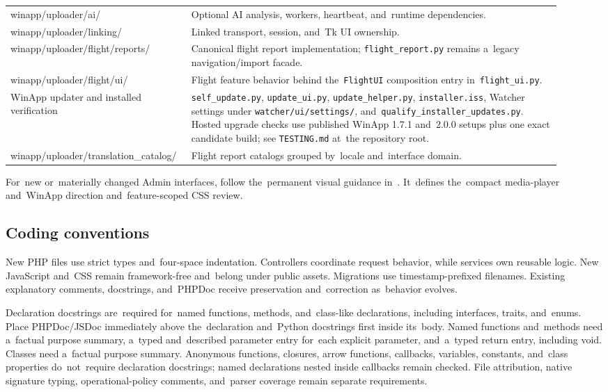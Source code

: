 \documentclass[11pt,a4paper]{article}
\newcommand{\filepath}[1]{\path{#1}}
\begin{document}
\begin{longtable}{>{\ttfamily}p{0.27\linewidth}p{0.65\linewidth}}
winapp/uploader/ai/ & Optional AI analysis, workers, heartbeat, and~runtime dependencies.\\
winapp/uploader/linking/ & Linked transport, session, and~Tk UI ownership.\\
winapp/uploader/flight/reports/ & Canonical flight report implementation; \texttt{flight\_report.py} remains a~legacy navigation/import facade.\\
winapp/uploader/flight/ui/ & Flight feature behavior behind the~\texttt{FlightUI} composition entry in~\texttt{flight\_ui.py}.\\
WinApp updater and installed verification & \texttt{self\_update.py}, \texttt{update\_ui.py}, \texttt{update\_helper.py}, \texttt{installer.iss}, Watcher settings under \texttt{watcher/ui/settings/}, and~\texttt{qualify\_installer\_updates.py}. Hosted upgrade checks use published WinApp 1.7.1 and~2.0.0 setups plus one exact candidate build; see \texttt{TESTING.md} at~the repository root.\\
winapp/uploader/translation\_catalog/ & Flight report catalogs grouped by~locale and~interface domain.\\
\bottomrule
\end{longtable}

For~new or~materially changed Admin interfaces, follow the~permanent visual
guidance in~\filepath{docs/ADMIN_DESIGN.md}. It~defines the~compact media-player
and~WinApp direction and~feature-scoped CSS review.

\subsection{Coding conventions}

New PHP files use strict types and~four-space indentation. Controllers
coordinate request behavior, while services own reusable logic. New JavaScript
and~CSS remain framework-free and~belong under public assets. Migrations use
timestamp-prefixed filenames. Existing explanatory comments, docstrings,
and~PHPDoc receive preservation and~correction as~behavior evolves.

Declaration docstrings are~required for~named functions, methods, and~class-like
declarations, including interfaces, traits, and~enums. Place PHPDoc/JSDoc
immediately above the~declaration and~Python docstrings first inside its~body.
Named functions and~methods need a~factual purpose summary, a~typed
and~described parameter entry for~each explicit parameter, and~a~typed return
entry, including void. Classes need a~factual purpose summary. Anonymous
functions, closures, arrow functions, callbacks, variables, constants, and~class
properties do~not~require declaration docstrings; named declarations nested
inside callbacks remain checked. File attribution, native signature typing,
operational-policy comments, and~parser coverage remain separate requirements.
\end{document}
